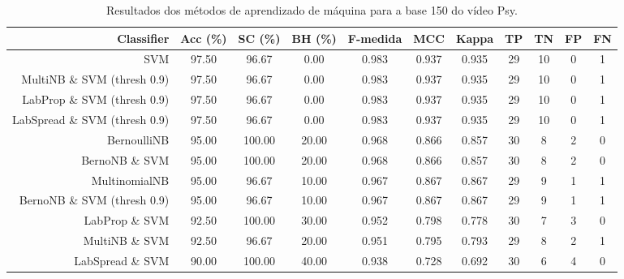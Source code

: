 \begin{table}[!htb]
\centering
\caption{Resultados dos métodos de aprendizado de máquina para a base 150 do vídeo Psy.}
\label{tab:Psy-150}
\begin{tabular}{r|c|c|c|c|c|c|c|c|c|c}
\hline\hline
Classifier & Acc (\%) & SC (\%) & BH (\%) & F-medida & MCC & Kappa & TP & TN & FP & FN \\ \hline
SVM & 97.50 & 96.67 & 0.00 & 0.983 & 0.937 & 0.935 & 29 & 10 & 0 & 1 \\ 
MultiNB \& SVM (thresh 0.9) & 97.50 & 96.67 & 0.00 & 0.983 & 0.937 & 0.935 & 29 & 10 & 0 & 1 \\ 
LabProp \& SVM (thresh 0.9) & 97.50 & 96.67 & 0.00 & 0.983 & 0.937 & 0.935 & 29 & 10 & 0 & 1 \\ 
LabSpread \& SVM (thresh 0.9) & 97.50 & 96.67 & 0.00 & 0.983 & 0.937 & 0.935 & 29 & 10 & 0 & 1 \\ 
BernoulliNB & 95.00 & 100.00 & 20.00 & 0.968 & 0.866 & 0.857 & 30 & 8 & 2 & 0 \\ 
BernoNB \& SVM & 95.00 & 100.00 & 20.00 & 0.968 & 0.866 & 0.857 & 30 & 8 & 2 & 0 \\ 
MultinomialNB & 95.00 & 96.67 & 10.00 & 0.967 & 0.867 & 0.867 & 29 & 9 & 1 & 1 \\ 
BernoNB \& SVM (thresh 0.9) & 95.00 & 96.67 & 10.00 & 0.967 & 0.867 & 0.867 & 29 & 9 & 1 & 1 \\ 
LabProp \& SVM & 92.50 & 100.00 & 30.00 & 0.952 & 0.798 & 0.778 & 30 & 7 & 3 & 0 \\ 
MultiNB \& SVM & 92.50 & 96.67 & 20.00 & 0.951 & 0.795 & 0.793 & 29 & 8 & 2 & 1 \\ 
LabSpread \& SVM & 90.00 & 100.00 & 40.00 & 0.938 & 0.728 & 0.692 & 30 & 6 & 4 & 0 \\ 
\hline\hline
\end{tabular}
\end{table}

